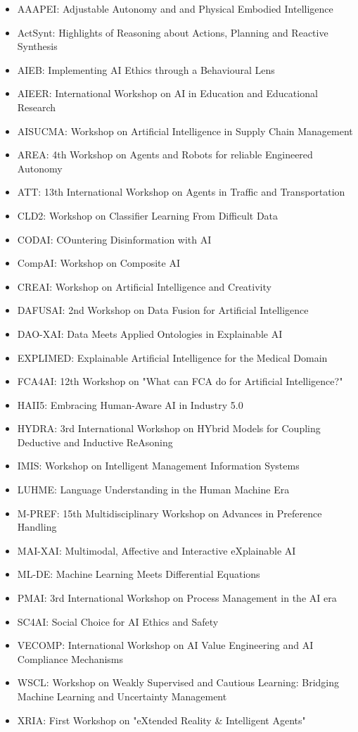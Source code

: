 \begin{itemize}
\item AAAPEI: Adjustable Autonomy and and Physical Embodied Intelligence
\item ActSynt: Highlights of Reasoning about Actions, Planning and Reactive Synthesis
\item AIEB: Implementing AI Ethics through a Behavioural Lens
\item AIEER: International Workshop on AI in Education and Educational Research
\item AISUCMA: Workshop on Artificial Intelligence in Supply Chain Management
\item AREA: 4th Workshop on Agents and Robots for reliable Engineered Autonomy
\item ATT: 13th International Workshop on Agents in Traffic and Transportation
\item CLD2: Workshop on Classifier Learning From Difficult Data
\item CODAI: COuntering Disinformation with AI
\item CompAI: Workshop on Composite AI
\item CREAI: Workshop on Artificial Intelligence and Creativity
\item DAFUSAI: 2nd Workshop on Data Fusion for Artificial Intelligence
\item DAO-XAI: Data Meets Applied Ontologies in Explainable AI
\item EXPLIMED: Explainable Artificial Intelligence for the Medical Domain
\item FCA4AI: 12th Workshop on "What can FCA do for Artificial Intelligence?"
\item HAII5: Embracing Human-Aware AI in Industry 5.0
\item HYDRA: 3rd International Workshop on HYbrid Models for Coupling Deductive and Inductive ReAsoning
\item IMIS: Workshop on Intelligent Management Information Systems
\item LUHME: Language Understanding in the Human Machine Era
\item M-PREF: 15th Multidisciplinary Workshop on Advances in Preference Handling
\item MAI-XAI: Multimodal, Affective and Interactive eXplainable AI
\item ML-DE: Machine Learning Meets Differential Equations
\item PMAI: 3rd International Workshop on Process Management in the AI era
\item SC4AI: Social Choice for AI Ethics and Safety
\item VECOMP: International Workshop on AI Value Engineering and AI Compliance Mechanisms
\item WSCL: Workshop on Weakly Supervised and Cautious Learning: Bridging Machine Learning and Uncertainty Management
\item XRIA: First Workshop on "eXtended Reality \& Intelligent Agents"
\end{itemize}
